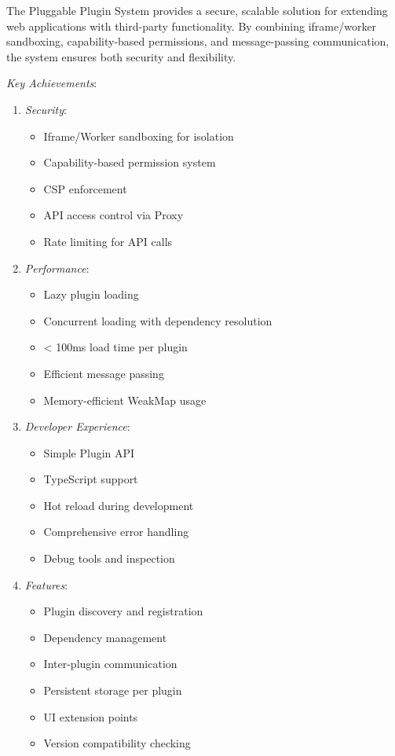 \documentclass[11pt]{article}
\begin{document}
The Pluggable Plugin System provides a secure, scalable solution for extending web applications with third-party functionality. By combining iframe/worker sandboxing, capability-based permissions, and message-passing communication, the system ensures both security and flexibility.

\emph{Key Achievements}:

\begin{enumerate}
\item \emph{Security}:

\begin{itemize}
\item Iframe/Worker sandboxing for isolation
\item Capability-based permission system
\item CSP enforcement
\item API access control via Proxy
\item Rate limiting for API calls
\end{itemize}

\item \emph{Performance}:

\begin{itemize}
\item Lazy plugin loading
\item Concurrent loading with dependency resolution
\item < 100ms load time per plugin
\item Efficient message passing
\item Memory-efficient WeakMap usage
\end{itemize}

\item \emph{Developer Experience}:

\begin{itemize}
\item Simple Plugin API
\item TypeScript support
\item Hot reload during development
\item Comprehensive error handling
\item Debug tools and inspection
\end{itemize}

\item \emph{Features}:

\begin{itemize}
\item Plugin discovery and registration
\item Dependency management
\item Inter-plugin communication
\item Persistent storage per plugin
\item UI extension points
\item Version compatibility checking
\end{itemize}
\end{enumerate}
\end{document}
